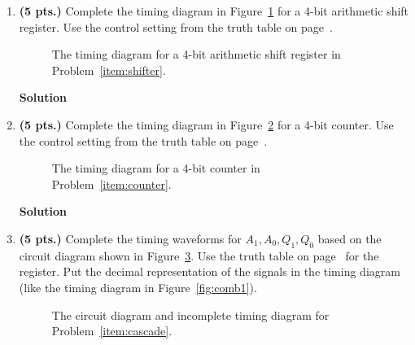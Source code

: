 \begin{enumerate}
    \item\textbf{ (5 pts.)} Complete the timing diagram in Figure~\ref{fig:hwshift}
        \label{item:shifter}
        for a 4-bit arithmetic shift register.  Use the control setting from the
        truth table on page~\pageref{page:shi}.
        \begin{figure}[ht]
            \caption{The timing diagram for a 4-bit arithmetic shift register in
            Problem~\ref{item:shifter}.}
            \label{fig:hwshift}
        \end{figure}

        \begin{onlysolution}  \textbf{Solution} \itshape{
                \begin{figure}[ht]
                \end{figure}
            }
        \end{onlysolution}

    \item\textbf{ (5 pts.)} Complete the timing diagram in Figure~\ref{fig:hwcount}
        \label{item:counter}
        for a 4-bit counter.  Use the control setting from the truth table on
        page~\pageref{page:counter}.
        \begin{figure}[ht]
            \caption{The timing diagram for a 4-bit counter in
            Problem~\ref{item:counter}.}
            \label{fig:hwcount}
        \end{figure}

        \begin{onlysolution}  \textbf{Solution} \itshape{
                \begin{figure}[ht]
                \end{figure}
            }
        \end{onlysolution}

    \item\textbf{ (5 pts.)} Complete the timing waveforms for $A_1, A_0, Q_1, Q_0$
        \label{item:cascade}
        based on the circuit diagram shown in Figure~\ref{fig:cascade}.  Use the truth
        table on page~\pageref{page:reg} for the register. Put the decimal
        representation of the signals in the timing diagram (like the timing
        diagram in Figure~\ref{fig:comb1}).
        \begin{figure}[ht]
            \caption{The circuit diagram and incomplete timing diagram for
            Problem~\ref{item:cascade}.}
            \label{fig:cascade}
        \end{figure}


\end{enumerate}
